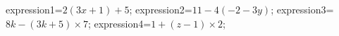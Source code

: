 \documentclass[exercice]{thedocument}%
\begin{document}
%
    \>expression1=$2(3x+1)+5$;%
    \>expression2=$11-4(-2-3y)$;%
    \>expression3=$8k-(3k+5)\times7$;%
    \>expression4=$1+(z-1)\times2$;%
\end{document}

